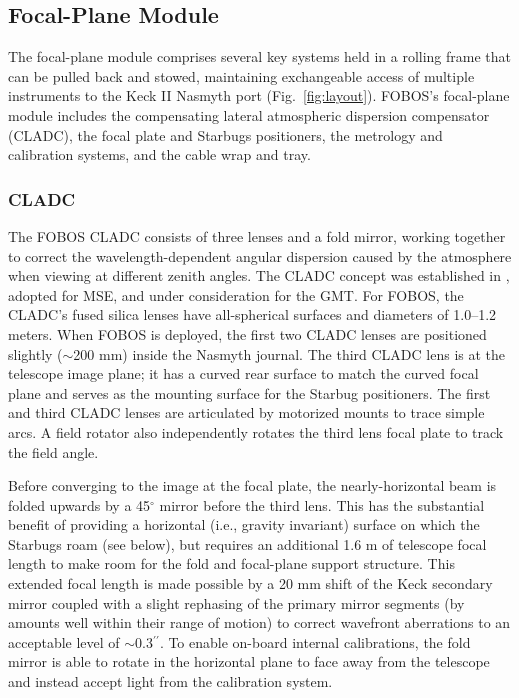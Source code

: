 \documentclass[oneside,11pt]{amsart}
\newcommand{\arcsec}{\mbox{$^{\prime\prime}$}}
\begin{document}
\subsection{Focal-Plane Module} The focal-plane module comprises several key systems held in a rolling frame that can be pulled back and stowed, maintaining exchangeable access of multiple instruments to the Keck II Nasmyth port (Fig.~\ref{fig:layout}).  FOBOS's focal-plane module includes the compensating lateral atmospheric dispersion compensator (CLADC), the focal plate and Starbugs positioners, the metrology and calibration systems, and the cable wrap and tray.

\subsubsection{CLADC} The FOBOS CLADC consists of three lenses and a fold mirror, working together to correct the wavelength-dependent angular dispersion caused by the atmosphere when viewing at different zenith angles. The CLADC concept was established in \citet{saunders14}, adopted for MSE, and under consideration for the GMT.  For FOBOS, the CLADC's fused silica lenses have all-spherical surfaces and diameters of 1.0--1.2 meters.  When FOBOS is deployed, the first two CLADC lenses are positioned slightly ($\sim$200 mm) inside the Nasmyth journal.  The third CLADC lens is at the telescope image plane; it has a curved rear surface to match the curved focal plane and serves as the mounting surface for the Starbug positioners.  The first and third CLADC lenses are articulated by motorized mounts to trace simple arcs.  A field rotator also independently rotates the third lens focal plate to track the field angle.

Before converging to the image at the focal plate, the nearly-horizontal beam is folded upwards by a 45$^\circ$ mirror before the third lens. This has the substantial benefit of providing a horizontal (i.e., gravity invariant) surface on which the Starbugs roam (see below), but requires an additional 1.6 m of telescope focal length to make room for the fold and focal-plane support structure.  This extended focal length is made possible by a 20 mm shift of the Keck secondary mirror coupled with a slight rephasing of the primary mirror segments (by amounts well within their range of motion) to correct wavefront aberrations to an acceptable level of $\sim$0.3\arcsec{}.  To enable on-board internal calibrations, the fold mirror is able to rotate in the horizontal plane to face away from the telescope and instead accept light from the calibration system.
\end{document}

